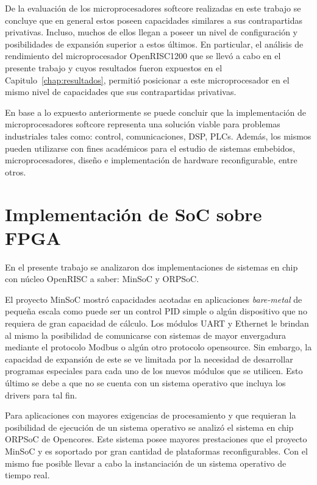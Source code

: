 De la evaluación de los microprocesadores softcore realizadas en este trabajo se concluye que en general estos poseen capacidades similares a sus contrapartidas privativas. Incluso, muchos de ellos llegan a poseer un nivel de configuración y posibilidades de expansión superior a estos últimos. En particular, el análisis de rendimiento del microprocesador OpenRISC1200 que se llevó a cabo en el presente trabajo y cuyos resultados fueron expuestos en el Capitulo~\ref {chap:resultados}, permitió posicionar a este microprocesador en el mismo nivel de capacidades que sus contrapartidas privativas.

En base a lo expuesto anteriormente se puede concluir que la implementación de microprocesadores softcore representa una solución viable para problemas industriales tales como: control, comunicaciones, DSP, PLCs. Además, los mismos pueden utilizarse con fines académicos para el estudio de sistemas embebidos, microprocesadores, diseño e implementación de hardware reconfigurable, entre otros.

\section{Implementación de SoC sobre FPGA}

En el presente trabajo se analizaron dos implementaciones de sistemas en chip con núcleo OpenRISC a saber: MinSoC y ORPSoC.

El proyecto MinSoC mostró capacidades acotadas en aplicaciones \textit{bare-metal} de pequeña escala como puede ser un control PID simple o algún dispositivo que no requiera de gran capacidad de cálculo. Los módulos UART y Ethernet le brindan al mismo la posibilidad de comunicarse con sistemas de mayor envergadura mediante el protocolo Modbus o algún otro protocolo opensource. Sin embargo, la capacidad de expansión de este se ve limitada por la necesidad de desarrollar programas especiales para cada uno de los nuevos módulos que se utilicen. Esto último se debe a que no se cuenta con un sistema operativo que incluya los drivers para tal fin.

Para aplicaciones con mayores exigencias de procesamiento y que requieran la posibilidad de ejecución de un sistema operativo se analizó el sistema en chip ORPSoC de Opencores. Este sistema posee mayores prestaciones que el proyecto MinSoC y es soportado por gran cantidad de plataformas reconfigurables. Con el mismo fue posible llevar a cabo la instanciación de un sistema operativo de tiempo real.

